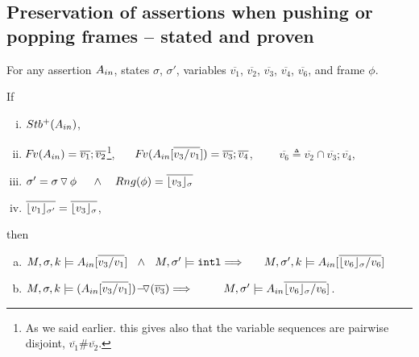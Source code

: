  
 
 \subsection{Preservation of assertions when pushing or popping frames -- stated and proven}
\begin{lemma}
\label{l:calls}

For any assertion $\Ain$, states $\sigma$, $\sigma'$,  
variables  $\overline{v_1}$,    $\overline{v_2}$,  $\overline{v_3}$,  $\overline{v_4}$,  $\overline{v_6}$,  %
and frame $\phi$.

\noindent
If 
\begin{enumerate}[(i)]
\item 
\label{l:calls:r:one}
$ \Pos \Ain$,  
\item 
\label{l:calls:r:two}
$\fv(\Ain) =  \overline{v_1}; \overline{v_2} $\footnote{As we said earlier. this gives  also that the variable sequences  are pairwise disjoint, \ie $\overline{v_1}\#\overline{v_2}$.},
\ \ \ 
$\fv(\Ain[\overline {v_3/v_1}]) =  \overline{v_3}; \overline{v_4} $, \ \ \ \ 
$ \overline {v_6}\triangleq\overline{v_2}\cap\overline{v_3}; \overline{v_4} $, 
\item
\label{l:calls:r:three}
$\sigma'=\sigma  \pushSymbol \phi  \ \ \ \  \wedge\ \ \  Rng(\phi)= \overline{\interpret {\sigma} {v_3} }$
\item
\label{l:calls:r:four}
 $\overline {\interpret {\sigma'}  {v_1} } = \overline {\interpret {\sigma} {v_3} }$, 

\end{enumerate}

\noindent
then

\begin{enumerate}[a.]
\item
\label{l:calls:callee:one}
$\satDAssertFrom M  \sigma k   \Ain[\overline {v_3/v_1}] %
\ \ \wedge\ \ M, \sigma' \models \intThis
 \hfill \Longrightarrow  \ \ \  \   \ \satDAssertFrom M  {\sigma'} k  {\Ain[\overline { {\interpret {\sigma} {v_6}} / {v_6} } ] } $
 
\item

\label{l:calls:callee:two}
$ \satDAssertFrom M  \sigma k    {\PushASLong  {(\overline {v_3})} {(\Ain[\overline {v_3/v_1}])}} 
\hfill \Longrightarrow  \ \ \  \   \ \ \  \  
M, \sigma' \models   {\Ain\overline { {\interpret {\sigma} {v_6}} / {v_6} } ] }$.

\end{enumerate}

\end{lemma}


